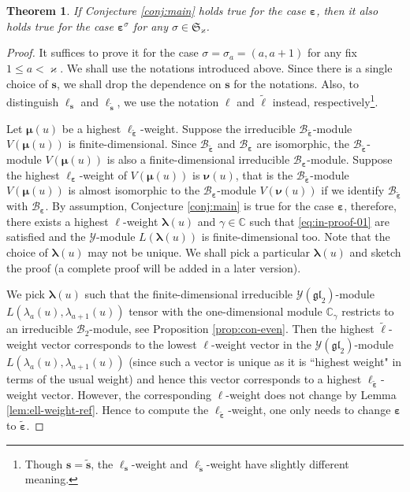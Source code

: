 \documentclass[11pt,reqno]{amsart}
\numberwithin{equation}{section}
\newtheorem{thm}{Theorem}[section]
\theoremstyle{definition}
\theoremstyle{remark}
\newcommand{\gl}{\mathfrak{gl}}
\newcommand{\fkS}{\mathfrak{S}}
\newcommand{\bC}{\mathbb{C}}
\newcommand{\tl}{\tilde}
\newcommand{\lle}{\leqslant}
\newcommand{\la}{\lambda}
\newcommand{\bla}{\bm\lambda}
\newcommand{\ka}{\varkappa}
\newcommand{\ve}{\varepsilon}
\newcommand{\s}{{\bm s}}
\begin{document}

\begin{thm}\label{thm:reflection}
If Conjecture \ref{conj:main} holds true for the case $\bm\ve$, then it also holds true for the case $\bm \ve^\sigma$ for any $\sigma\in\fkS_\ka$.
\end{thm}
\begin{proof}
It suffices to prove it for the case $\sigma=\sigma_a=(a,a+1)$ for any fix $1\lle a<\ka$. We shall use the notations introduced above. Since there is a single choice of $\s$, we shall drop the dependence on $\s$ for the notations. Also, to distinguish $\ell_{\s}$ and $\ell_{\tl\s}$, we use the notation $\ell$ and $\tl \ell$ instead, respectively\footnote{Though $\s=\tl\s$, the $\ell_\s$-weight and $\ell_{\tl\s}$-weight have slightly different meaning.}.

Let $\bm\mu(u)$ be a highest $\ell_{\tl{\bm\ve}}$-weight. Suppose the irreducible $\mathscr B_{\tl{\bm\ve}}$-module  $V(\bm\mu(u))$ is finite-dimensional. Since $\mathscr B_{\tl{\bm\ve}}$ and $\mathscr B_{\bm\ve}$ are isomorphic, the $\mathscr B_{\tl{\bm\ve}}$-module  $V(\bm\mu(u))$ is also a finite-dimensional irreducible $\mathscr B_{\bm\ve}$-module. Suppose the highest $\ell_{\bm\ve}$-weight of $V(\bm\mu(u))$ is $\bm\nu(u)$, that is the $\mathscr B_{\tl{\bm\ve}}$-module $V(\bm\mu(u))$ is almost isomorphic to the $\mathscr B_{\bm\ve}$-module $V(\bm\nu(u))$ if we identify $\mathscr B_{\tl{\bm\ve}}$ with $\mathscr B_{\bm\ve}$. By assumption, Conjecture \ref{conj:main} is true for the case $\bm\ve$, therefore, there exists a highest $\ell$-weight $\bla(u)$ and $\gamma\in\bC$ such that \eqref{eq:in-proof-01} are satisfied and the $\mathscr Y$-module $L(\bla(u))$ is finite-dimensional too. Note that the choice of $\bla(u)$ may not be unique. We shall pick a particular $\bla(u)$ and sketch the proof (a complete proof will be added in a later version).

We pick $\bla(u)$ such that the finite-dimensional irreducible $\mathscr{Y}(\gl_2)$-module $L(\la_a(u),\la_{a+1}(u))$ tensor with the one-dimensional module $\bC_{\gamma}$ restricts to an irreducible $\mathscr B_2$-module, see Proposition \ref{prop:con-even}. Then the highest $\tl\ell$-weight vector corresponds to the lowest $\ell$-weight vector in the $\mathscr{Y}(\gl_2)$-module $L(\la_a(u),\la_{a+1}(u))$ (since such a vector is unique as it is ``highest weight" in terms of the usual weight) and hence this vector corresponds to a highest $\ell_{\tl{\bm\ve}}$-weight vector. However, the corresponding $\ell$-weight does not change by Lemma \ref{lem:ell-weight-ref}. Hence to compute the $\ell_{\tl{\bm\ve}}$-weight, one only needs to change  $\bm\ve$ to $\tl{\bm\ve}$.
\end{proof}
\end{document}
